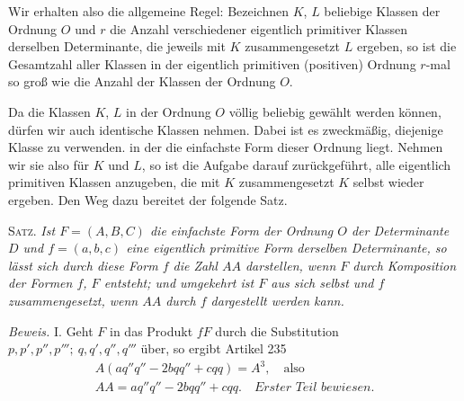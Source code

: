 Wir erhalten also die allgemeine Regel: Bezeichnen \(K\), \(L\) beliebige Klassen der Ordnung \(O\) und \(r\) die Anzahl verschiedener eigentlich primitiver Klassen derselben Determinante, die jeweils mit \(K\) zusammengesetzt \(L\) ergeben, so ist die Gesamtzahl aller Klassen in der eigentlich primitiven (positiven) Ordnung \(r\)-mal so groß wie die Anzahl der Klassen der Ordnung \(O\).

Da die Klassen \(K\), \(L\) in der Ordnung \(O\) völlig beliebig gewählt werden können, dürfen wir auch identische Klassen nehmen. Dabei ist es zweckmäßig, diejenige Klasse zu verwenden. in der die einfachste Form dieser Ordnung liegt. Nehmen wir sie also für \(K\) und \(L\), so ist die Aufgabe darauf zurückgeführt, alle eigentlich primitiven Klassen anzugeben, die mit \(K\) zusammengesetzt \(K\) selbst wieder ergeben. Den Weg dazu bereitet der folgende Satz.

\textsc{Satz.} \textit{Ist \(F=(A,B,C)\) die einfachste Form der Ordnung \(O\) der Determinante \(D\) und \(f=(a,b,c)\) eine eigentlich primitive Form derselben Determinante, so lässt sich durch diese Form \(f\) die Zahl \(AA\) darstellen, wenn \(F\) durch Komposition der Formen \(f\), \(F\) entsteht; und umgekehrt ist \(F\) aus sich selbst und \(f\) zusammengesetzt, wenn \(AA\) durch \(f\) dargestellt werden kann.}

\textit{Beweis.} I. Geht \(F\) in das Produkt \(fF\) durch die Substitution \(p,\allowbreak p',\allowbreak p'',\allowbreak p''';\allowbreak \ q,\allowbreak q',\allowbreak q'',\allowbreak q'''\) über, so ergibt Artikel 235
\[
\begin{gathered}A(aq''q''-2bqq''+cqq)=A^3,\quad\text{also}\\ AA=aq''q''-2bqq''+cqq.\quad\textit{Erster Teil bewiesen.}\end{gathered}
\]

